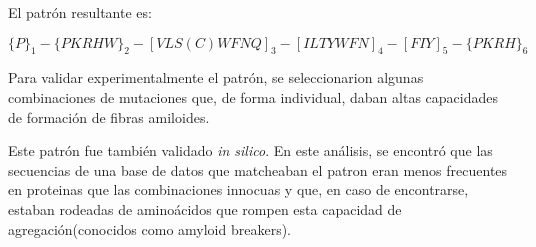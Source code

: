 El patrón resultante es:

$\{P\}_1 -\{PKRHW\}_2 -[VLS(C)WFNQ]_3 -[ILTYWFN]_4 -[FIY]_5- \{PKRH\}_6 $

% 



Para validar experimentalmente el patrón, se seleccionarion algunas combinaciones de mutaciones que, de forma individual, daban altas capacidades de formación de fibras amiloides. 

Este patrón fue también validado \textit{in silico}. En este análisis, se encontró que las secuencias de una base de datos que matcheaban el patron eran menos frecuentes en proteinas que las combinaciones innocuas y que, en caso de encontrarse, estaban rodeadas de aminoácidos que 
rompen esta capacidad de agregación(conocidos como amyloid breakers).



